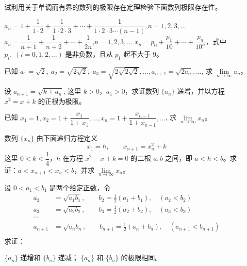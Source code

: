 \begin{Exercise}
\begin{question}
  \item 试利用关于单调而有界的数列的极限存在定理检验下面数列极限存在性。
  \begin{tasks}
    \task $a_n=1+\dfrac{1}{1\cdot 2}+\dfrac{1}{1\cdot 2\cdot 3}+\cdots+\dfrac{1}{1\cdot 2\cdot 3\cdots (n-1)}$,\quad $n=1,2,3,\ldots$
    \task $a_n=\dfrac{1}{n+1}+\dfrac{1}{n+2}+\cdots +\dfrac{1}{2n}$,\quad $n=1,2,3,\ldots$
    \task $x_n=p_0+\dfrac{p_1}{10}+\cdots +\dfrac{p_n}{10^n}$，式中 $p_i,\; (i=0,1,2,\ldots)$ 是非负数，且从 $p_1$ 起不大于 9。
  \end{tasks}
  \item 已知 $a_1=\sqrt{2},\; a_2=\sqrt{2\sqrt{2}},\; a_3=\sqrt{2\sqrt{2\sqrt{2}}},\ldots,a_{n+1}=\sqrt{2a_n},\ldots$, 求 $\lim\limits_{n\to\infty}a_n$。
  \item 设 $a_{n+1}=\sqrt{k+a_n}$, 这里 $k>0$，$a_1>0$，求证数列 $\{a_n\}$ 递增，并以方程 $x^2=x+k$ 的正根为极限。
  \item 已知 $x_1=1,x_2=1+\dfrac{x_1}{1+x_1},\ldots,x_n=1+\dfrac{x_{n-1}}{1+x_{n-1}},\ldots$, 求 $\lim\limits_{n\to\infty}x_n$。
  \item 数列 $\{x_n\}$ 由下面递归方程定义
  \[x_1=h,\qquad x_{n+1}=x_n^2+k\]
  这里 $0<k<\dfrac{1}{4}$，$h$ 在方程 $x^2-x+k=0$ 的二根 $a,b$ 之间，即 $a<h<b$。求证：$a<x_{n+1}<x_n<b$，并求 $\lim\limits_{n\to\infty}x_n$。
  \item 设 $0<a_1<b_1$ 是两个给定正数，令 
  \[\begin{split}
    a_2&=\sqrt{a_1b_1},\qquad b_2=\frac{1}{2}(a_1+b_1),\quad (a_2<b_2)\\
    a_3&=\sqrt{a_2b_2},\qquad b_3=\frac{1}{2}(a_2+ b_2),\quad (a_3<b_3)\\
    \cdots \\
    a_{n+1}&=\sqrt{a_nb_n},\qquad b_{n+1}=\frac{1}{2}(a_n+b_n),\quad (a_{n+1}<b_{n+1})\\
  \end{split}\]
  求证：
  \begin{tasks}
    \task $\{a_n\}$ 递增和 $\{b_n\}$ 递减；
    \task $\{a_n\}$ 和 $\{b_n\}$ 的极限相同。
  \end{tasks}
\end{question}
\end{Exercise}